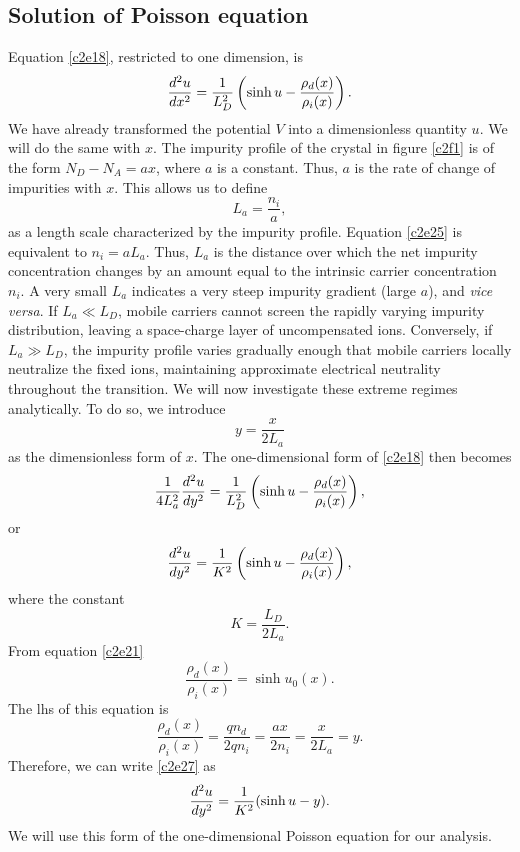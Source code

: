 \subsection{Solution of Poisson equation}
Equation \eqref{c2e18}, restricted to one dimension, is
\[
\frac{d^2{u}}{d{x}^2} = \frac{1}{L_D^2}\left(\sinh u - \frac{\rho_d(x)}{\rho_i(x)}\right).
\]
We have already transformed the potential $V$ into a dimensionless quantity $u$.
We will do the same with $x$. The impurity profile of the crystal in figure
\ref{c2f1} is of the form $N_D - N_A = ax$, where $a$ is a constant. Thus, $a$
is the rate of change of impurities with $x$. This allows us to define
\begin{equation}\label{c2e25}
L_a = \frac{n_i}{a},
\end{equation}
as a length scale characterized by the impurity profile. Equation \eqref{c2e25}
is equivalent to $n_i = a L_a$. Thus, $L_a$ is the distance over which the net 
impurity concentration changes by an amount equal to the intrinsic carrier 
concentration $n_i$. A very small $L_a$ indicates a very steep impurity gradient
(large $a$), and \emph{vice versa}. If $L_a \ll L_D$, mobile carriers cannot 
screen the rapidly varying impurity distribution, leaving a space-charge layer 
of uncompensated ions. Conversely, if $L_a \gg L_D$, the impurity profile varies
gradually enough that mobile carriers locally neutralize the fixed ions, 
maintaining approximate electrical neutrality throughout the transition. We 
will now investigate these extreme regimes analytically. To do so, we introduce
\begin{equation}\label{c2e26}
y = \frac{x}{2L_a}
\end{equation}
as the dimensionless form of $x$. The one-dimensional form of \eqref{c2e18}
then becomes
\[
\frac{1}{4L_a^2}\frac{d^2{u}}{d{y}^2} = \frac{1}{L_D^2}
\left(\sinh u - \frac{\rho_d(x)}{\rho_i(x)}\right),
\]
or
\begin{equation}\label{c2e27}
\frac{d^2{u}}{d{y}^2} = \frac{1}{K^2} \left(\sinh u - \frac{\rho_d(x)}{\rho_i(x)}\right),
\end{equation}
where the constant
\begin{equation}\label{c2e28}
K = \frac{L_D}{2L_a}.
\end{equation}
From equation \eqref{c2e21}
\[
\frac{\rho_d(x)}{\rho_i(x)} = \sinh u_0(x).
\]
The lhs of this equation is
\[
\frac{\rho_d(x)}{\rho_i(x)} = \frac{qn_d}{2qn_i} = \frac{ax}{2n_i} = \frac{x}
{2L_a} = y.
\]
Therefore, we can write \eqref{c2e27} as
\begin{equation}\label{c2e29}
\frac{d^2{u}}{d{y}^2} = \frac{1}{K^2} (\sinh u - y).
\end{equation}
We will use this form of the one-dimensional Poisson equation for our analysis.

